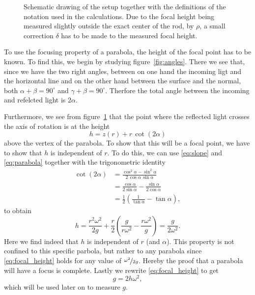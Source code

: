 \documentclass[12pt, a4paper, twocolumn]{article}
\begin{document}
\begin{figure}
\centering
\resizebox{.6\linewidth}{!}{}
\caption{
Schematic drawing of the setup together with the definitions of the notation used in the calculations. Due to the focal height being measured slightly outside the exact center of the rod, by $\rho$, a small correction $\delta$ has to be made to the measured focal height.} 
\label{fig:rot_bowl} 
\end{figure}

To use the focusing property of a parabola, the height of the focal point has to be known. To find this, we begin by studying figure~\ref{fig:angles}. There we see that, since we have the two right angles, between on one hand the incoming ligt and the horizontal line and on the other hand between the surface and the normal, both 
$\alpha+\beta = 90^\circ$ and $\gamma+\beta = 90^\circ$. 
Therfore the total angle between the incoming and refelcted light is $2\alpha$. 

Furthermore, we see from figure~\ref{fig:rot_bowl} that the point where the reflected light crosses the axis of rotation is at the height 
\begin{equation}
h= z(r) + r\,\cot(2\alpha)
\end{equation}
above the vertex of the parabola.
To show that this will be a focal point, we have to show that $h$ is independent of $r$. To do this, we can use \eqref{eq:slope} and \eqref{eq:parabola} together with the trigonometric identity
\begin{equation}
\begin{aligned}
\cot(2\alpha)
&=\frac{\cos^2\alpha-\sin^2\alpha}{2\,\cos\alpha\,\sin\alpha}\\
&=\frac{\cos\alpha}{2\sin\alpha}-\frac{\sin\alpha}{2\cos\alpha}\\
&=\frac{1}{2}\left(\frac{1}{\tan\alpha} -\tan\alpha \right),
\end{aligned}
\end{equation}
to obtain
\begin{equation}\label{eq:focal_height}
h=\frac{r^2\omega^2}{2g} 
   + \frac{r}{2}\left(\frac{g}{r\omega^2} -\frac{r\omega^2}{g} \right)
=\frac{g}{2\omega^2}.
\end{equation}
Here we find indeed that $h$ is independent of $r$ (and $\alpha$). This property is not confined to this specific parbola, but rather to any parabola since \eqref{eq:focal_height} holds for any value of $\nicefrac{\omega^2}{2g}$. Hereby the proof that a parabola will have a focus is complete. 
Lastly we rewrite \eqref{eq:focal_height} to get
\begin{equation}
g=2h\omega^2,
\end{equation}
which will be used later on to measure $g$. 
\end{document}
